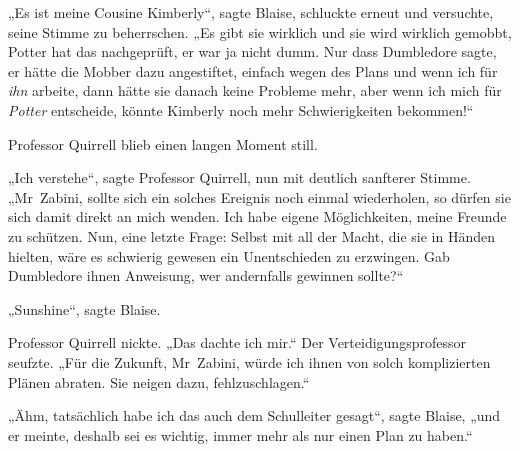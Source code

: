 „Es ist meine Cousine Kimberly“, sagte Blaise, schluckte erneut und versuchte, seine Stimme zu beherrschen.
„Es gibt sie wirklich und sie wird wirklich gemobbt, Potter hat das nachgeprüft, er war ja nicht dumm. Nur dass Dumbledore sagte, er hätte die Mobber dazu angestiftet, einfach wegen des Plans und wenn ich für \emph{ihn} arbeite, dann hätte sie danach keine Probleme mehr, aber wenn ich mich für \emph{Potter} entscheide, könnte Kimberly noch mehr Schwierigkeiten bekommen!“

Professor Quirrell blieb einen langen Moment still.

„Ich verstehe“, sagte Professor Quirrell, nun mit deutlich sanfterer Stimme.
„Mr~Zabini, sollte sich ein solches Ereignis noch einmal wiederholen, so dürfen sie sich damit direkt an mich wenden. Ich habe eigene Möglichkeiten, meine Freunde zu schützen. Nun, eine letzte Frage: Selbst mit all der Macht, die sie in Händen hielten, wäre es schwierig gewesen ein Unentschieden zu erzwingen. Gab Dumbledore ihnen Anweisung, wer andernfalls gewinnen sollte?“

„Sunshine“, sagte Blaise.

Professor Quirrell nickte.
„Das dachte ich mir.“ Der Verteidigungsprofessor seufzte.
„Für die Zukunft, Mr~Zabini, würde ich ihnen von solch komplizierten Plänen abraten. Sie neigen dazu, fehlzuschlagen.“

„Ähm, tatsächlich habe ich das auch dem Schulleiter gesagt“, sagte Blaise, „und er meinte, deshalb sei es wichtig, immer mehr als nur einen Plan zu haben.“

